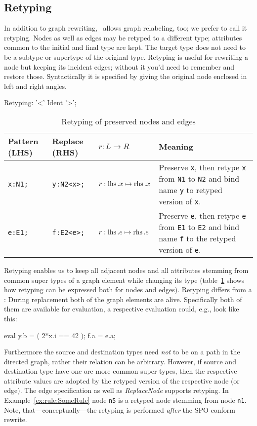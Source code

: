 \subsection{Retyping} \label{sec:retype}
In addition to graph rewriting, \GrG\ allows graph relabeling\cite{Relabelling}, too; we prefer to call it retyping. 
Nodes as well as edges may be retyped to a different type; attributes common to the initial and final type are kept.
The target type does not need to be a subtype or supertype of the original type.
Retyping is useful for rewriting a node but keeping its incident edges; without it you'd need to remember and restore those.
Syntactically it is specified by giving the original node enclosed in left and right angles.
\begin{rail}
  Retyping: '<' Ident '>';
\end{rail}

\begin{table}[htbp]
\centering
\begin{tabularx}{\linewidth}{lllX}
  \textbf{Pattern (LHS)} & \textbf{Replace (RHS)} & \textbf{$r: L \longrightarrow R$} & \textbf{Meaning} \\ \hline 
  \texttt{x:N1;} & \texttt{y:N2<x>;}          & $r:\operatorname{lhs}.x \mapsto \operatorname{rhs}.x$ & Preserve \texttt{x}, then retype \texttt{x} from \texttt{N1} to \texttt{N2} and bind name \texttt{y} to retyped version of \texttt{x}.\\
  \texttt{e:E1;} & \texttt{f:E2<e>;}          & $r:\operatorname{lhs}.e \mapsto \operatorname{rhs}.e$ & Preserve \texttt{e}, then retype \texttt{e} from \texttt{E1} to \texttt{E2} and bind name \texttt{f} to the retyped version of \texttt{e}.\\
\end{tabularx}
\caption{Retyping of preserved nodes and edges}
\label{rule:retyping_graphlets}
\end{table}

Retyping enables us to keep all adjacent nodes and all attributes stemming from common super types of a graph element while changing its type (table~\ref{rule:retyping_graphlets} shows how retyping can be expressed both for nodes and edges).
Retyping differs from a : During replacement both of the graph elements are alive.
  Specifically both of them are available for evaluation, a respective evaluation could, e.g., look like this:
  \begin{grgenlet}
eval {
  y.b = ( 2*x.i == 42 );
  f.a = e.a;
}
  \end{grgenlet}
Furthermore the source and destination types need \emph{not} to be on a path in the directed  graph, rather their relation can be arbitrary.
However, if source and destination type have one ore more common super types, then the respective attribute values are adopted by the retyped version of the respective node (or edge).
The edge specification as well as \emph{ReplaceNode} supports retyping. 
In Example~\ref{ex:rule:SomeRule} node \texttt{n5} is a retyped node stemming from node \texttt{n1}.
Note, that---conceptually---the retyping is performed \emph{after} the SPO conform rewrite.

